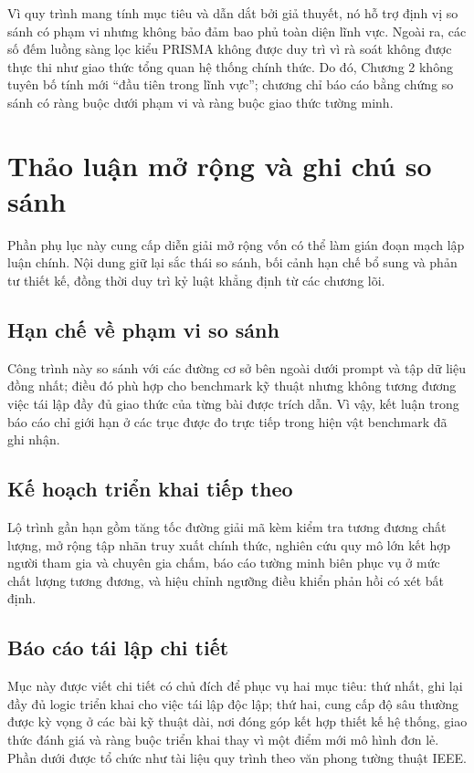 ﻿\documentclass[a4paper,12pt]{article}
\begin{document}
Vì quy trình mang tính mục tiêu và dẫn dắt bởi giả thuyết, nó hỗ trợ định vị so sánh có phạm vi nhưng không bảo đảm bao phủ toàn diện lĩnh vực. Ngoài ra, các số đếm luồng sàng lọc kiểu PRISMA không được duy trì vì rà soát không được thực thi như giao thức tổng quan hệ thống chính thức. Do đó, Chương 2 không tuyên bố tính mới ``đầu tiên trong lĩnh vực''; chương chỉ báo cáo bằng chứng so sánh có ràng buộc dưới phạm vi và ràng buộc giao thức tường minh.

\section{Thảo luận mở rộng và ghi chú so sánh}
Phần phụ lục này cung cấp diễn giải mở rộng vốn có thể làm gián đoạn mạch lập luận chính. Nội dung giữ lại sắc thái so sánh, bối cảnh hạn chế bổ sung và phản tư thiết kế, đồng thời duy trì kỷ luật khẳng định từ các chương lõi.
\subsection{Hạn chế về phạm vi so sánh}
Công trình này so sánh với các đường cơ sở bên ngoài dưới prompt và tập dữ liệu đồng nhất; điều đó phù hợp cho benchmark kỹ thuật nhưng không tương đương việc tái lập đầy đủ giao thức của từng bài được trích dẫn. Vì vậy, kết luận trong báo cáo chỉ giới hạn ở các trục được đo trực tiếp trong hiện vật benchmark đã ghi nhận.

\subsection{Kế hoạch triển khai tiếp theo}
Lộ trình gần hạn gồm tăng tốc đường giải mã kèm kiểm tra tương đương chất lượng, mở rộng tập nhãn truy xuất chính thức, nghiên cứu quy mô lớn kết hợp người tham gia và chuyên gia chấm, báo cáo tường minh biên phục vụ ở mức chất lượng tương đương, và hiệu chỉnh ngưỡng điều khiển phản hồi có xét bất định.

\subsection{Báo cáo tái lập chi tiết}
Mục này được viết chi tiết có chủ đích để phục vụ hai mục tiêu: thứ nhất, ghi lại đầy đủ logic triển khai cho việc tái lập độc lập; thứ hai, cung cấp độ sâu thường được kỳ vọng ở các bài kỹ thuật dài, nơi đóng góp kết hợp thiết kế hệ thống, giao thức đánh giá và ràng buộc triển khai thay vì một điểm mới mô hình đơn lẻ. Phần dưới được tổ chức như tài liệu quy trình theo văn phong tường thuật IEEE.
\end{document}
